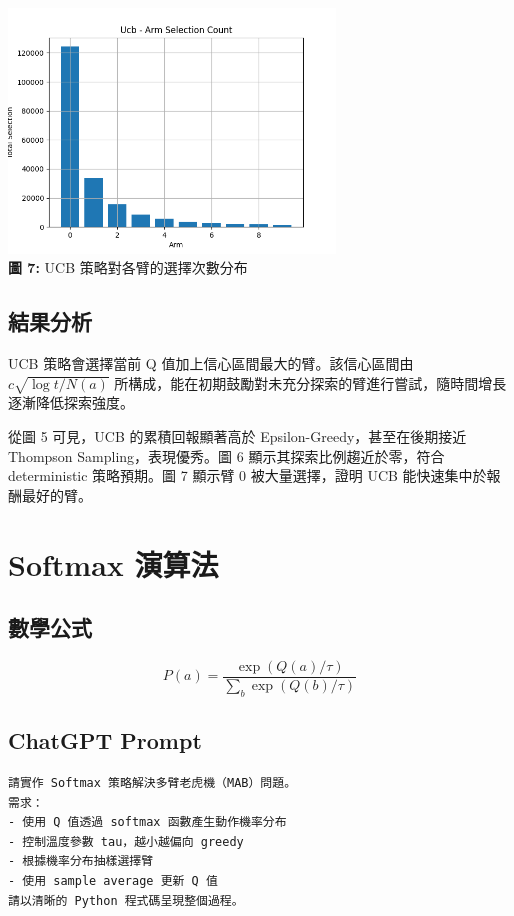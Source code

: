 \documentclass{article}
\begin{document}
\begin{center}
\includegraphics[width=0.65\textwidth]{./plots/ucb_armcount.png} \\
\textbf{圖 7:} UCB 策略對各臂的選擇次數分布
\end{center}

\subsection*{結果分析}
UCB 策略會選擇當前 Q 值加上信心區間最大的臂。該信心區間由 \( c \sqrt{\log t / N(a)} \) 所構成，能在初期鼓勵對未充分探索的臂進行嘗試，隨時間增長逐漸降低探索強度。

從圖 5 可見，UCB 的累積回報顯著高於 Epsilon-Greedy，甚至在後期接近 Thompson Sampling，表現優秀。圖 6 顯示其探索比例趨近於零，符合 deterministic 策略預期。圖 7 顯示臂 0 被大量選擇，證明 UCB 能快速集中於報酬最好的臂。

\newpage
\section{Softmax 演算法}

\subsection*{數學公式}
\begin{equation*}
P(a) = \frac{\exp(Q(a)/\tau)}{\sum_{b} \exp(Q(b)/\tau)}
\end{equation*}

\subsection*{ChatGPT Prompt}
\begin{verbatim}
請實作 Softmax 策略解決多臂老虎機（MAB）問題。
需求：
- 使用 Q 值透過 softmax 函數產生動作機率分布
- 控制溫度參數 tau，越小越偏向 greedy
- 根據機率分布抽樣選擇臂
- 使用 sample average 更新 Q 值
請以清晰的 Python 程式碼呈現整個過程。

\end{verbatim}
\end{document}
